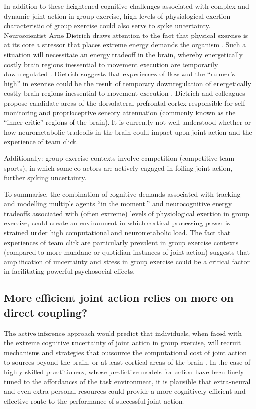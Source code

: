 \begin{CJK}{UTF8}{gbsn}
In addition to these heightened cognitive challenges associated with complex and dynamic joint action in group exercise, high levels of physiological exertion characteristic of group exercise could also serve to spike uncertainty.  Neuroscientist Arne Dietrich draws attention to the fact that physical exercise is at its core a stressor that places extreme energy demands the organism \citep{Dietrich2011}.
Such a situation will necessitate an energy tradeoff in the brain, whereby energetically costly brain regions inessential to movement execution are temporarily downregulated \citep{Dietrich2004b}.  Dietrich suggests that experiences of flow and the ``runner's high'' in exercise could be the result of temporary downregulation of energetically costly brain regions inessential to movement execution  \citep{Dietrich2004b}.  Dietrich and colleagues propose candidate areas of the dorsolateral prefrontal cortex responsible for self-monitoring and proprioceptive sensory attenuation (commonly known as the ``inner critic'' regions of the brain).  It is currently not well understood whether or how neurometabolic tradeoffs in the brain could impact upon joint action and the experience of team click.


Additionally: group exercise contexts involve competition (competitive team sports), in which some co-actors are actively engaged in foiling joint action, further spiking uncertainty.

To summarise, the combination of cognitive demands associated with tracking and modelling multiple agents ``in the moment,'' and neurocognitive energy tradeoffs associated with (often extreme) levels of physiological exertion in group exercise, could create an environment in which cortical processing power is strained under high computational and neurometabolic load.  The fact that experiences of team click are particularly prevalent in group exercise contexts (compared to more mundane or quotidian instances of joint action) suggests that amplification of uncertainty and stress in group exercise could be a critical factor in facilitating powerful psychosocial effects.


\subsection{More efficient joint action relies on more on direct coupling?}

The active inference approach would predict that individuals, when faced with the extreme cognitive uncertainty of joint action in group exercise, will recruit mechanisms and strategies that outsource the computational cost of joint action to sources beyond the brain, or at least cortical areas of the brain \citep{Dietrich2004,Clark2015}.  In the case of highly skilled practitioners, whose predictive models for action have been finely tuned to the affordances of the task environment, it is plausible that extra-neural and even extra-personal resources could provide a more cognitively efficient and effective route to the performance of successful joint action.


\end{CJK}
